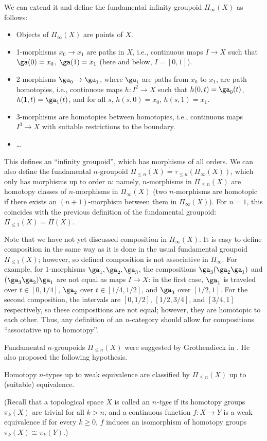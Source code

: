 We can extend it and define the fundamental infinity groupoid $\Pi_{\infty}(X)$
as follows:
\begin{itemize}
  \item Objects of $\Pi_{\infty}(X)$ are points of $X$.
  \item 1-morphisms $x_0\to x_1$ are paths in $X$, i.e., continuous maps
    $I\to X$ such that $\ga(0)=x_0$, $\ga(1)=x_1$ (here and below, $I=[0,1]$).
  \item 2-morphisms $\ga_0\to \ga_1$, where $\ga_i$ are paths from $x_0$ to
  $x_1$, are path homotopies, i.e., continuous maps $h\colon I^2\to X$ such that
  $h(0,t)=\ga_0(t)$, $h(1, t)=\ga_1(t)$, and for all $s$, $h(s,0)=x_0$,
  $h(s,1)=x_1$.
  \item 3-morphisms are homotopies between homotopies, i.e., continuous maps
  $I^3\to X$ with suitable restrictions to the boundary.
  \item \dots
\end{itemize}
This defines an ``infinity groupoid'', which has morphisms of all orders. We can
also define the fundamental $n$-groupoid $\Pi_{\leq n}(X)=\tau_{\leq
n}(\Pi_\infty(X))$, which only has morphisms up to order $n$: namely,
$n$-morphisms in $\Pi_{\leq n}(X)$ are homotopy classes of
$n$-morphisms in $\Pi_{\infty}(X)$ (two $n$-morphisms are homotopic if there
exists an $(n+1)$-morphism between them in $\Pi_\infty(X)$). For $n=1$, this
coincides with the previous definition of the fundamental groupoid:
$\Pi_{\le 1}(X)=\Pi(X)$.

Note that we have not yet discussed composition in $\Pi_\infty(X)$. It is easy
to define composition in the same way as it is done in the usual fundamental
groupoid $\Pi_{\le 1}(X)$; however, so defined composition is not associative in
$\Pi_\infty$. For example, for $1$-morphisms $\ga_1, \ga_2, \ga_3$, the
compositions $\ga_3 (\ga_2 \ga_1)$ and $(\ga_3 \ga_2)\ga_1$ are not equal as
maps $I\to X$: in the first case, $\ga_1$ is traveled over $t\in [0, 1/4]$,
$\ga_2$ over $t\in [1/4, 1/2]$, and $\ga_3$ over $[1/2,1]$. For the second
composition, the intervals are $[0, 1/2]$, $[1/2, 3/4]$, and $[3/4,1]$
respectively, so these compositions are not equal; however, they are homotopic
to each other. Thus, any definition of an $n$-category should allow for
compositions ``associative up to homotopy''.

Fundamental $n$-groupoids $\Pi_{\leq n}(X)$ were suggested by Grothendieck in
\cite{grothendieck}. He also proposed the following hypothesis.
\begin{conjecture}
  Homotopy $n$-types up to weak equivalence
  are classified by $\Pi_{\leq n}(X)$ up to (suitable) equivalence.
\end{conjecture}
(Recall that a topological space $X$ is called an \emph{$n$-type} if its
homotopy groups $\pi_k(X)$ are trivial for all $k>n$, and a continuous function
$f\colon X\to Y$ is a weak equivalence if for every $k\ge 0$, $f$ induces an
isomorphism of homotopy groups $\pi_k(X)\cong \pi_k(Y)$.)

